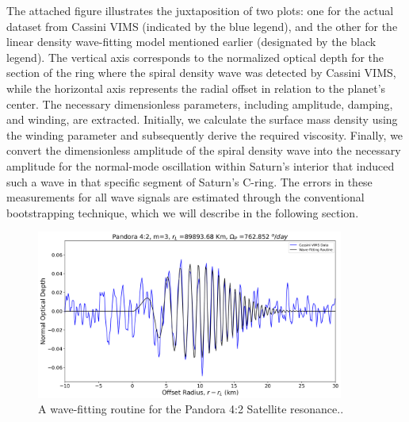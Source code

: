 \documentclass{article}
\begin{document}
\vspace{10}
The attached figure illustrates the juxtaposition of two plots: one for the actual dataset from Cassini VIMS (indicated by the blue legend), and the other for the linear density wave-fitting model mentioned earlier (designated by the black legend). The vertical axis corresponds to the normalized optical depth for the section of the ring where the spiral density wave was detected by Cassini VIMS, while the horizontal axis represents the radial offset in relation to the planet's center.
The necessary dimensionless parameters, including amplitude, damping, and winding, are extracted. Initially, we calculate the surface mass density using the winding parameter and subsequently derive the required viscosity. Finally, we convert the dimensionless amplitude of the spiral density wave into the necessary amplitude for the normal-mode oscillation within Saturn's interior that induced such a wave in that specific segment of Saturn's C-ring.
The errors in these measurements for all wave signals are estimated through the conventional bootstrapping technique, which we will describe in the following section.


\begin{figure}[h]
\centering 
\includegraphics[width=0.9\textwidth]{pandora_42_wavefit.png} 
\caption{A wave-fitting routine for the Pandora 4:2 Satellite resonance..} \label{fig:my_label}
\end{figure}
\end{document}
